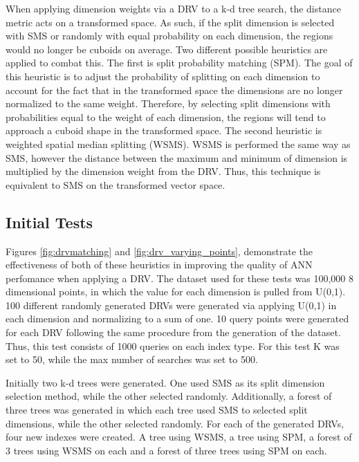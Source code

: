 When applying dimension weights via a DRV to a k-d tree search, the distance metric acts on a transformed space.  As such, if the split dimension is selected with SMS or randomly with equal probability on each dimension, the regions would no longer be cuboids on average.  Two different possible heuristics are applied to combat this.  The first is split probability matching (SPM).  The goal of this heuristic is to adjust the probability of splitting on each dimension to account for the fact that in the transformed space the dimensions are no longer normalized to the same weight.  Therefore, by selecting split dimensions with probabilities equal to the weight of each dimension, the regions will tend to approach a cuboid shape in the transformed space.  The second heuristic is weighted spatial median splitting (WSMS).  WSMS is performed the same way as SMS, however the distance between the maximum and minimum of dimension is multiplied by the dimension weight from the DRV.  Thus, this technique is equivalent to SMS on the transformed vector space.

\subsection{Initial Tests}
\label{sec:inittest}

Figures \ref{fig:drvmatching} and \ref{fig:drv_varying_points}, demonstrate the effectiveness of both of these heuristics in improving the quality of ANN perfomance when applying a DRV.  The dataset used for these tests was 100,000 8 dimensional points, in which the value for each dimension is pulled from U(0,1).  100 different randomly generated DRVs were generated via applying U(0,1) in each dimension and normalizing to a sum of one.  10 query points were generated for each DRV following the same procedure from the generation of the dataset.  Thus, this test consists of 1000 queries on each index type.  For this test K was set to 50, while the max number of searches was set to 500.

Initially two k-d trees were generated.  One used SMS as its split dimension selection method, while the other selected randomly.  Additionally, a forest of three trees was generated in which each tree used SMS to selected split dimensions, while the other selected randomly.  For each of the generated DRVs, four new indexes were created.  A tree using WSMS, a tree using SPM, a forest of 3 trees using WSMS on each and a forest of three trees using SPM on each.

